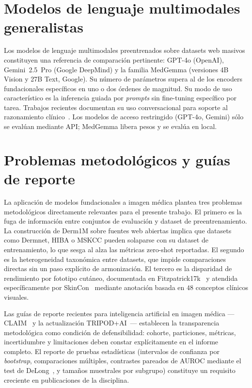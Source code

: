 \section{Modelos de lenguaje multimodales generalistas}
\label{sec:llm-multimodal}

Los modelos de lenguaje multimodales preentrenados sobre datasets web
masivos constituyen una referencia de comparación pertinente: GPT-4o
(OpenAI), Gemini~2.5~Pro (Google DeepMind) y la familia MedGemma
(versiones 4B Vision y 27B Text, Google). Su número de parámetros
supera al de los encoders fundacionales específicos en uno o dos
órdenes de magnitud. Su modo de uso característico es la inferencia
guiada por \emph{prompts} sin fine-tuning específico por
tarea. Trabajos recientes documentan su uso conversacional para
soporte al razonamiento clínico~\cite{amie2024,deepmind_aicoclinician}.
Los modelos de acceso restringido (GPT-4o, Gemini) sólo se evalúan
mediante API; MedGemma libera pesos y se evalúa en local.

\section{Problemas metodológicos y guías de reporte}
\label{sec:problemas-metodologicos}

La aplicación de modelos fundacionales a imagen médica plantea tres
problemas metodológicos directamente relevantes para el presente
trabajo. El primero es la fuga de información entre conjuntos de
evaluación y dataset de preentrenamiento. La construcción de Derm1M
sobre fuentes web abiertas implica que datasets como Dermnet, HIBA
o MSKCC pueden solaparse con su dataset de entrenamiento, lo que
sesga al alza las métricas zero-shot reportadas. El segundo es la
heterogeneidad taxonómica entre datasets, que impide comparaciones
directas sin un paso explícito de armonización. El tercero es la
disparidad de rendimiento por fototipo cutáneo, documentada en
Fitzpatrick17k~\cite{fitzpatrick17k} y atendida específicamente por
SkinCon~\cite{skincon} mediante anotación basada en $48$
conceptos clínicos visuales.

Las guías de reporte recientes para inteligencia artificial en
imagen médica ---CLAIM~\cite{claim2024} y la actualización
TRIPOD+AI~\cite{tripodai2024}--- establecen la transparencia metodológica como
condición de defensibilidad: cohorte, particiones, métricas,
incertidumbre y limitaciones deben constar explícitamente en el
informe completo. El reporte de pruebas estadísticas (intervalos de
confianza por \emph{bootstrap}, comparaciones múltiples,
contrastes pareados de AUROC mediante el test de
DeLong~\cite{delong1988}, y tamaños muestrales por subgrupo)
constituye un requisito creciente en publicaciones de la disciplina.

